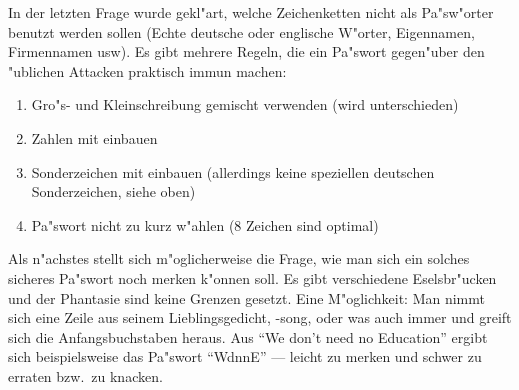 In der letzten Frage wurde gekl"art, welche Zeichenketten nicht als Pa"sw"orter
benutzt werden sollen (Echte deutsche oder englische W"orter, Eigennamen,
Firmennamen usw). Es gibt mehrere Regeln, die ein Pa"swort gegen"uber den
"ublichen Attacken praktisch immun machen: 

\begin{enumerate}
  \item Gro"s- und Kleinschreibung gemischt verwenden (wird unterschieden)
  \item Zahlen mit einbauen
  \item Sonderzeichen mit einbauen (allerdings keine speziellen deutschen
    Sonderzeichen, siehe oben)
  \item Pa"swort nicht zu kurz w"ahlen (8 Zeichen sind optimal) 
\end{enumerate}

Als n"achstes stellt sich m"oglicherweise die Frage, wie man sich ein solches
sicheres Pa"swort noch merken k"onnen soll. Es gibt verschiedene Eselsbr"ucken
und der Phantasie sind keine Grenzen gesetzt. Eine M"oglichkeit: Man nimmt sich
eine Zeile aus seinem Lieblingsgedicht, -song, oder was auch immer und greift
sich die Anfangsbuchstaben heraus. Aus "`We don't need no Education"' ergibt
sich beispielsweise das Pa"swort "`WdnnE"' --- leicht zu merken und schwer zu
erraten bzw.\  zu knacken.

